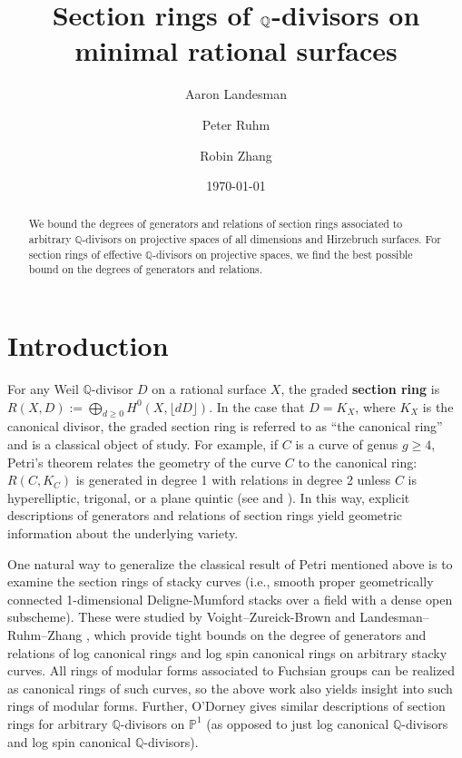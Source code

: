 \documentclass{amsart}
\title[Section rings of $\bq$-divisors]{Section rings of $\bq$-divisors on minimal rational surfaces}
\author{Aaron Landesman}
\author{Peter Ruhm}
\author{Robin Zhang}
\date{\today}
\theoremstyle{plain}
\theoremstyle{definition}
\theoremstyle{remark}
\numberwithin{equation}{section}
\newcommand\bq{{\mathbb Q}}
\newcommand\bp{{\mathbb P}}
\begin{document}
\begin{abstract}
 	We bound the degrees of generators and relations of
	section rings associated to arbitrary $\bq$-divisors on projective spaces of 
	all dimensions and Hirzebruch surfaces. For section rings of
	effective $\bq$-divisors on projective spaces, we find 
	the best possible bound on
	the degrees of generators and relations.
\end{abstract}

\maketitle

\section{Introduction}
\label{sec:intro}
For any Weil $\bq$-divisor $D$ on a rational surface $X$, the graded
\textbf{section ring} is $R(X, D) := \bigoplus_{d \geq 0}
H^0(X, \lfloor dD \rfloor)$.
In the case that $D = K_X$, where $K_X$ is the canonical divisor,
the graded section ring is referred to as
``the canonical ring'' and is a classical object of study.
For example, if $C$ is a curve of genus $g \geq 4$, Petri's theorem
relates the geometry of the curve $C$ to the canonical ring:
$R(C, K_C)$ is generated in degree 1 with relations in degree 2 
unless $C$ is hyperelliptic, trigonal, or a plane quintic
(see
\cite[p. 157]{saint-donat:proj} and \cite[Section 3.3]{acgh:algebraic-curves}).
In this way, explicit descriptions of generators and relations of section rings yield
geometric information about the underlying variety.

One natural way to generalize the classical result of Petri
mentioned above is to examine the section rings of stacky curves
(i.e., smooth proper geometrically connected 1-dimensional
Deligne-Mumford stacks over a field with a dense open subscheme).
These were studied by Voight--Zureick-Brown 
\cite{vzb:stacky} and Landesman--Ruhm--Zhang \cite{lrz:spin-cring},
which provide tight bounds on the degree of generators and relations
of log canonical rings and log spin canonical rings on arbitrary
stacky curves. All rings of modular forms associated to Fuchsian
groups can be realized as canonical rings of
such curves, so the above work also yields insight into such rings
of modular forms.
Further, 
O'Dorney \cite{dorney:canonical} gives similar descriptions
of section rings for arbitrary $\bq$-divisors on $\bp^1$
(as opposed to just log canonical $\bq$-divisors and log spin canonical $\bq$-divisors).
\end{document}
